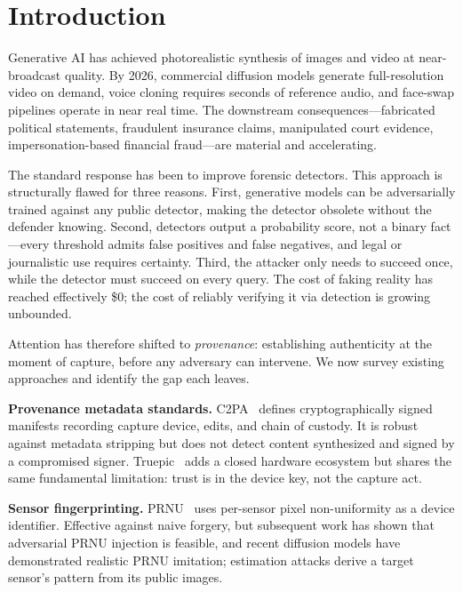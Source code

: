 \documentclass[11pt]{article}
\begin{document}
\section{Introduction}

Generative AI has achieved photorealistic synthesis of images and video at
near-broadcast quality. By 2026, commercial diffusion models generate
full-resolution video on demand, voice cloning requires seconds of reference
audio, and face-swap pipelines operate in near real time. The downstream
consequences---fabricated political statements, fraudulent insurance claims,
manipulated court evidence, impersonation-based financial fraud---are material
and accelerating.

The standard response has been to
improve forensic detectors. This approach is structurally flawed for three
reasons. First, generative models can be adversarially trained against any
public detector, making the detector obsolete without the defender knowing.
Second, detectors output a probability score, not a binary fact---every
threshold admits false positives and false negatives, and legal or journalistic
use requires certainty. Third, the attacker only needs to succeed once, while the
detector must succeed on every query. The cost of faking reality has reached
effectively \$0; the cost of reliably verifying it via detection is growing
unbounded.

Attention has therefore shifted to \emph{provenance}: establishing
authenticity at the moment of capture, before any adversary can intervene.
We now survey existing approaches and identify the gap each leaves.

\textbf{Provenance metadata standards.} C2PA~\cite{c2pa} defines
cryptographically signed manifests recording capture device, edits, and chain
of custody. It is robust against metadata stripping but does not detect content
synthesized and signed by a compromised signer. Truepic~\cite{truepic} adds a
closed hardware ecosystem but shares the same fundamental limitation: trust is
in the device key, not the capture act.

\textbf{Sensor fingerprinting.} PRNU~\cite{prnu} uses per-sensor pixel
non-uniformity as a device identifier. Effective against naive forgery, but
subsequent work has shown that adversarial PRNU injection is feasible, and
recent diffusion models have demonstrated realistic PRNU imitation; estimation
attacks derive a target sensor's pattern from its public images.
\end{document}
